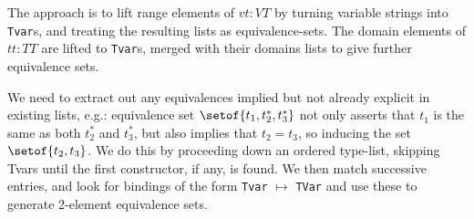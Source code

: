 The approach is to lift range elements of $vt : VT$
by turning variable strings into \texttt{Tvar}s,
and treating the resulting lists as equivalence-sets.
The domain elements of $tt :TT$ are lifted to \texttt{Tvar}s,
merged with their domains lists to give further equivalence sets.

We need to extract out
any equivalences implied but not already explicit
in existing lists,
e.g.: equivalence set $\setof{t_1,t_2^*,t_3^*}$
not only asserts that $t_1$ is the same as both $t_2^*$
and $t_3^*$, but also implies that $t_2 = t_3$,
so inducing the set $\setof{t_2,t_3}$.
We do this by proceeding down an ordered type-list,
skipping Tvars until the first constructor, if any, is found.
We then match successive entries, and look for bindings
of the form \texttt{Tvar} $\mapsto$ \texttt{TVar} and use these to generate
2-element equivalence sets.